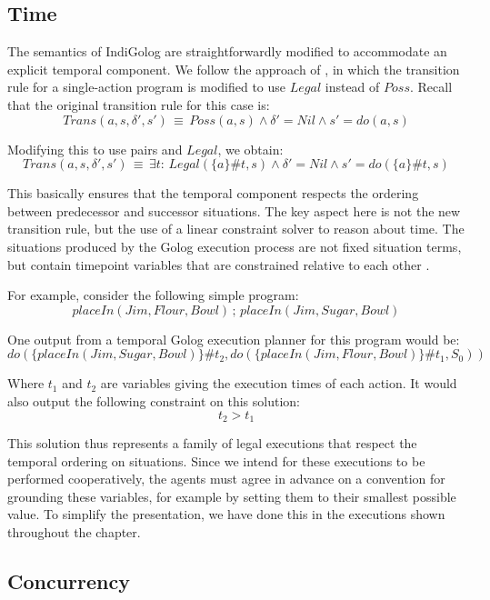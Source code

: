 \subsection{Time}

The semantics of IndiGolog are straightforwardly modified to accommodate
an explicit temporal component. We follow the approach of \citep{Reiter98seq_temp_golog,reiter01kia},
in which the transition rule for a single-action program is modified
to use $Legal$ instead of $Poss$. Recall that the original transition
rule for this case is:\[
Trans(a,s,\delta',s')\,\equiv\, Poss(a,s)\wedge\delta'=Nil\wedge s'=do(a,s)\]


Modifying this to use  pairs and $Legal$,
we obtain:\begin{equation}
Trans(a,s,\delta',s')\,\equiv\,\exists t:\, Legal(\{a\}\#t,s)\wedge\delta'=Nil\wedge s'=do(\{a\}\#t,s)\label{eq:MIndiGolog:temp_trans_a}\end{equation}


This basically ensures that the temporal component respects the ordering
between predecessor and successor situations. The key aspect here
is not the new transition rule, but the use of a linear constraint
solver to reason about time. The situations produced by the Golog
execution process are not fixed situation terms, but contain timepoint
variables that are constrained relative to each other \citep{Reiter98seq_temp_golog}.

For example, consider the following simple program:\[
placeIn(Jim,Flour,Bowl)\,;\, placeIn(Jim,Sugar,Bowl)\]


One output from a temporal Golog execution planner for this program
would be:\[
do(\{placeIn(Jim,Sugar,Bowl)\}\#t_{2},do(\{placeIn(Jim,Flour,Bowl)\}\#t_{1},S_{0}))\]


Where $t_{1}$ and $t_{2}$ are variables giving the execution times
of each action. It would also output the following constraint on this
solution:\[
t_{2}>t_{1}\]


This solution thus represents a family of legal executions that respect
the temporal ordering on situations. Since we intend for these executions
to be performed cooperatively, the agents must agree in advance on
a convention for grounding these variables, for example by setting
them to their smallest possible value. To simplify the presentation,
we have done this in the executions shown throughout the chapter.


\subsection{Concurrency}

